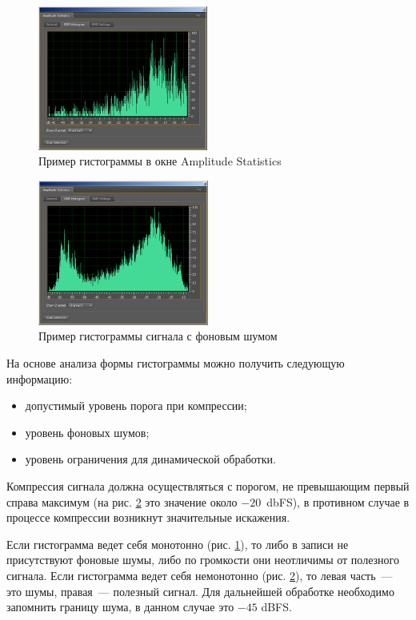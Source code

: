 \documentclass[oneside, final, 14pt]{extreport}
\begin{document}
\begin{figure}[h!]
\centering
\includegraphics[width=0.5\textwidth]{pic-histogram-01}
\caption{Пример гистограммы в окне Amplitude Statistics}
\label{pic-histogram-01}
\end{figure}

\begin{figure}[h!]
\centering
\includegraphics[width=0.5\textwidth]{pic-histogram-02}
\caption{Пример гистограммы сигнала с фоновым шумом}
\label{pic-histogram-02}
\end{figure}

На основе анализа формы гистограммы можно получить следующую
информацию:
\begin{itemize}
\item допустимый уровень порога при компрессии;
\item уровень фоновых шумов;
\item уровень ограничения для динамической обработки.
\end{itemize}

Компрессия сигнала должна осуществляться с порогом, не превышающим первый справа максимум (на рис. \ref{pic-histogram-02} это значение около $-20$~dbFS), в противном случае в процессе компрессии возникнут значительные искажения.

Если гистограмма ведет себя монотонно (рис. \ref{pic-histogram-01}), то либо в записи не присутствуют фоновые шумы, либо по громкости они неотличимы от полезного сигнала. Если гистограмма ведет себя немонотонно (рис. \ref{pic-histogram-02}), то левая часть~--- это шумы, правая~--- полезный сигнал. Для дальнейшей обработке необходимо запомнить границу шума, в данном случае это $-45$ dBFS.
\end{document}
